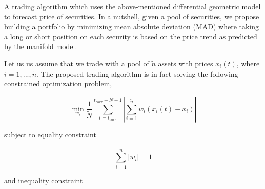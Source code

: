 \documentclass{article}
\begin{document}
A trading algorithm which uses the above-mentioned differential
geometric model to forecast price of securities. In a nutshell, given
a pool of securities, we propose building a portfolio by minimizing
mean absolute deviation (MAD) where taking a long or short position on
each security is based on the price trend as predicted by the manifold
model.

Let us us assume that we trade with a pool of $\tilde{n}$ assets with
prices $x_{i}(t)$, where $i = 1, ...,\tilde{n}$. The proposed trading
algorithm is in fact solving the following constrained optimization
problem,

\begin{equation}\label{eqn:mad-optimization-problem}
\min_{w_{i}} \frac{1}{\tilde{N}}\sum_{t=t_{curr}}^{t_{curr}-\tilde{N}+1}
|\sum_{i=1}^{\tilde{n}} w_{i} (x_{i}(t)-\bar{x_{i}})|
\end{equation}

subject to equality constraint

\begin{equation}\label{eqn:mad-sum-constraint}
\sum_{i=1}^{\tilde{n}} |w_{i}| = 1
\end{equation}

and inequality constraint
\end{document}
